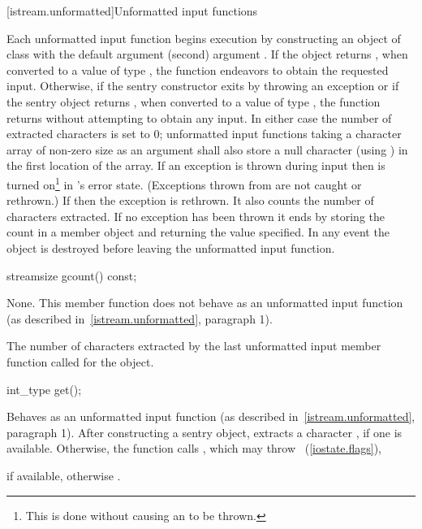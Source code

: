 [istream.unformatted]{Unformatted input functions}

\pnum
Each unformatted input function begins execution by constructing an object of class
with the default argument
(second) argument
.
If the
object returns
,
when converted to a value of type
,
the function endeavors
to obtain the requested input.
Otherwise, if the sentry constructor exits by throwing an exception or if
the sentry object returns , when converted to a value of type
,
the function returns without attempting to obtain any input.
In either case the number of extracted characters is set to 0;
unformatted input functions taking a character array of non-zero size as
an argument shall also store a null character (using
)
in the first location of the array.
If an exception is thrown during input then
is turned on\footnote{This is done without causing an
to be thrown.}
in
's
error state.
(Exceptions thrown from
are not caught or rethrown.)
If
then the exception is rethrown.
It also counts the number of characters extracted.
If no exception has been thrown it ends
by storing the count in a member object
and returning the value specified.
In any event the
object
is destroyed before leaving the unformatted input function.

%
\begin{itemdecl}
streamsize gcount() const;
\end{itemdecl}

\begin{itemdescr}
\pnum
\effects
None.
This member function does not behave as an unformatted
input function (as described in~\ref{istream.unformatted}, paragraph 1).

\pnum
\returns
The number of characters
extracted by the last unformatted input member function called for the object.
\end{itemdescr}

%
\begin{itemdecl}
int_type get();
\end{itemdecl}

\begin{itemdescr}
\pnum
\effects
Behaves as an unformatted input function
(as described in~\ref{istream.unformatted}, paragraph 1).
After constructing a sentry object, extracts
a character , if one is available.
Otherwise, the function calls
,
which may throw
~(\ref{iostate.flags}),

\pnum
\returns
{} if available,
otherwise
.
\end{itemdescr}

